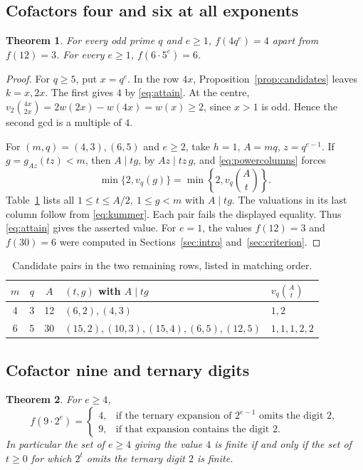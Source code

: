 \documentclass[a4paper,11pt]{article}
\newtheorem{theorem}{Theorem}[section]
\newcommand{\colg}[2]{g_{#1}(#2)}
\begin{document}
\subsection{Cofactors four and six at all exponents}

\begin{theorem}\label{thm:small}
For every odd prime \(q\) and \(e\ge1\), \(f(4q^e)=4\) apart from
\(f(12)=3\). For every \(e\ge1\), \(f(6\cdot5^e)=6\).
\end{theorem}

\begin{proof}
For \(q\ge5\), put \(x=q^e\). In the row \(4x\),
Proposition~\ref{prop:candidates} leaves \(k=x,2x\). The first gives
\(4\) by \eqref{eq:attain}. At the centre,
\(v_2\binom{4x}{2x}=2w(2x)-w(4x)=w(x)\ge2\), since \(x>1\) is odd.
Hence the second gcd is a multiple of \(4\).

For \((m,q)=(4,3),(6,5)\) and \(e\ge2\), take \(h=1\), \(A=mq\),
\(z=q^{e-1}\). If \(g=\colg{Az}{tz}<m\), then \(A\mid tg\), by
\(Az\mid tz\,g\), and \eqref{eq:powercolumns} forces
\[
 \min\{2,v_q(g)\}=\min\!\left\{2,v_q\binom At\right\}.
\]
Table~\ref{tab:exclusions} lists all \(1\le t\le A/2,\ 1\le g<m\)
with \(A\mid tg\). The valuations in its last column follow from
\eqref{eq:kummer}. Each pair fails the displayed equality.
Thus \eqref{eq:attain} gives the asserted value. For \(e=1\), the
values \(f(12)=3\) and \(f(30)=6\) were computed in
Sections~\ref{sec:intro} and~\ref{sec:criterion}.
\end{proof}

\begin{table}[ht]
\centering
\caption{Candidate pairs in the two remaining rows, listed in matching order.}
\label{tab:exclusions}
\begin{tabular}{@{}cccll@{}}
\toprule
\(m\)&\(q\)&\(A\)& \((t,g)\) with \(A\mid tg\) & \(v_q\binom At\)\\
\midrule
4&3&12& \((6,2),(4,3)\) & \(1,2\)\\
6&5&30& \((15,2),(10,3),(15,4),(6,5),(12,5)\) & \(1,1,1,2,2\)\\
\bottomrule
\end{tabular}
\end{table}

\clearpage
\subsection{Cofactor nine and ternary digits}

\begin{theorem}\label{thm:nine}
For \(e\ge4\),
\[
 f(9\cdot2^e)=
 \begin{cases}
  4,&\text{if the ternary expansion of \(2^{e-1}\) omits the digit \(2\)},\\
  9,&\text{if that expansion contains the digit \(2\)}.
 \end{cases}
\]
In particular the set of \(e\ge4\) giving the value \(4\) is finite if
and only if the set of \(t\ge0\) for which \(2^t\) omits the ternary
digit \(2\) is finite.
\end{theorem}
\end{document}
